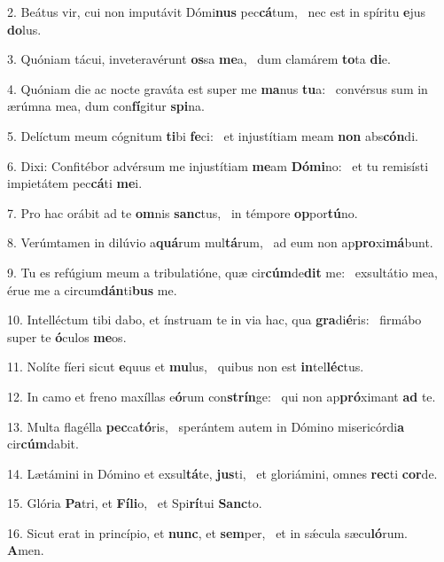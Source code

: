 2. Beátus vir, cui non imputávit Dómi\textbf{nus} pec\textbf{cá}tum, \ast\  nec est in spíritu \textbf{e}jus \textbf{do}lus.\

3. Quóniam tácui, inveteravérunt \textbf{os}sa \textbf{me}a, \ast\  dum clamárem \textbf{to}ta \textbf{di}e.\

4. Quóniam die ac nocte graváta est super me \textbf{ma}nus \textbf{tu}a: \ast\  convérsus sum in ærúmna mea, dum con\textbf{fí}gitur \textbf{spi}na.\

5. Delíctum meum cógnitum \textbf{ti}bi \textbf{fe}ci: \ast\  et injustítiam meam \textbf{non} abs\textbf{cón}di.\

6. Dixi: Confitébor advérsum me injustítiam \textbf{me}am \textbf{Dó}\textbf{mi}no: \ast\  et tu remisísti impietátem pec\textbf{cá}ti \textbf{me}i.\

7. Pro hac orábit ad te \textbf{om}nis \textbf{sanc}tus, \ast\  in témpore \textbf{op}por\textbf{tú}no.\

8. Verúmtamen in dilúvio a\textbf{quá}rum mul\textbf{tá}rum, \ast\  ad eum non ap\textbf{pro}xi\textbf{má}bunt.\

9. Tu es refúgium meum a tribulatióne, quæ cir\textbf{cúm}de\textbf{dit} me: \ast\  exsultátio mea, érue me a circum\textbf{dán}ti\textbf{bus} me.\

10. Intelléctum tibi dabo, et ínstruam te in via hac, qua \textbf{gra}di\textbf{é}ris: \ast\  firmábo super te \textbf{ó}culos \textbf{me}os.\

11. Nolíte fíeri sicut \textbf{e}quus et \textbf{mu}lus, \ast\  quibus non est \textbf{in}tel\textbf{léc}tus.\

12. In camo et freno maxíllas e\textbf{ó}rum con\textbf{strín}ge: \ast\  qui non ap\textbf{pró}ximant \textbf{ad} te.\

13. Multa flagélla \textbf{pec}ca\textbf{tó}ris, \ast\  sperántem autem in Dómino misericórdi\textbf{a} cir\textbf{cúm}dabit.\

14. Lætámini in Dómino et exsul\textbf{tá}te, \textbf{jus}ti, \ast\  et gloriámini, omnes \textbf{rec}ti \textbf{cor}de.\

15. Glória \textbf{Pa}tri, et \textbf{Fí}\textbf{li}o, \ast\  et Spi\textbf{rí}tui \textbf{Sanc}to.\

16. Sicut erat in princípio, et \textbf{nunc}, et \textbf{sem}per, \ast\  et in sǽcula sæcu\textbf{ló}rum. \textbf{A}men.\

